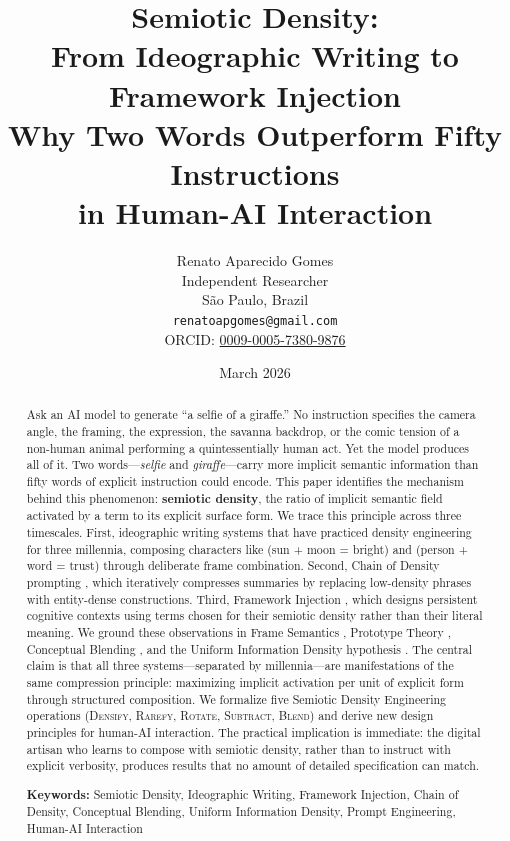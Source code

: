 \documentclass[12pt,a4paper]{article}
\title{%
  \vspace{-1cm}
  \textbf{Semiotic Density:\\
  From Ideographic Writing to Framework Injection}\\[0.5em]
  \large Why Two Words Outperform Fifty Instructions\\in Human-AI Interaction
}
\author{
  Renato Aparecido Gomes\\
  Independent Researcher\\
  S\~{a}o Paulo, Brazil\\
  \texttt{renatoapgomes@gmail.com}\\
  ORCID: \href{https://orcid.org/0009-0005-7380-9876}{0009-0005-7380-9876}
}
\date{March 2026}
\begin{document}
\maketitle
\thispagestyle{empty}

\begin{abstract}
\noindent
Ask an AI model to generate ``a selfie of a giraffe.''
No instruction specifies the camera angle, the framing, the expression, the savanna backdrop, or the comic tension of a non-human animal performing a quintessentially human act.
Yet the model produces all of it.
Two words---\textit{selfie} and \textit{giraffe}---carry more implicit semantic information than fifty words of explicit instruction could encode.
This paper identifies the mechanism behind this phenomenon: \textbf{semiotic density}, the ratio of implicit semantic field activated by a term to its explicit surface form.
We trace this principle across three timescales.
First, ideographic writing systems that have practiced density engineering for three millennia, composing characters like  (sun + moon = bright) and  (person + word = trust) through deliberate frame combination.
Second, Chain of Density prompting \cite{adams2023}, which iteratively compresses summaries by replacing low-density phrases with entity-dense constructions.
Third, Framework Injection \cite{gomes2026founding}, which designs persistent cognitive contexts using terms chosen for their semiotic density rather than their literal meaning.
We ground these observations in Frame Semantics \cite{fillmore1982}, Prototype Theory \cite{rosch1975}, Conceptual Blending \cite{fauconnier2002}, and the Uniform Information Density hypothesis \cite{frank2008}.
The central claim is that all three systems---separated by millennia---are manifestations of the same compression principle: maximizing implicit activation per unit of explicit form through structured composition.
We formalize five Semiotic Density Engineering operations (\textsc{Densify}, \textsc{Rarefy}, \textsc{Rotate}, \textsc{Subtract}, \textsc{Blend}) and derive new design principles for human-AI interaction.
The practical implication is immediate: the digital artisan who learns to compose with semiotic density, rather than to instruct with explicit verbosity, produces results that no amount of detailed specification can match.

\medskip
\noindent\textbf{Keywords:} Semiotic Density, Ideographic Writing, Framework Injection, Chain of Density, Conceptual Blending, Uniform Information Density, Prompt Engineering, Human-AI Interaction
\end{abstract}
\end{document}

